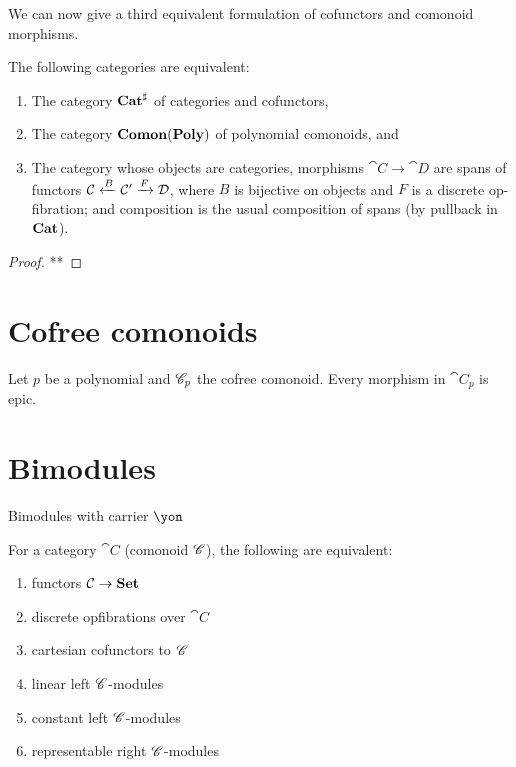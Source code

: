 \documentclass[DynamicalBook]{subfiles}
\begin{document}
We can now give a third equivalent formulation of cofunctors and comonoid morphisms.

\begin{proposition}
The following categories are equivalent:
\begin{enumerate}
	\item The category $\textbf{Cat}^\sharp$ of categories and cofunctors,
	\item The category $\textbf{Comon}(\textbf{Poly})$ of polynomial comonoids, and
	\item The category whose objects are categories, morphisms $\cat{C}\to\cat{D}$ are spans of functors $\mathcal{C}\xleftarrow{B}\mathcal{C}'\xrightarrow{F}\mathcal{D}$, where $B$ is bijective on objects and $F$ is a discrete op-fibration; and composition is the usual composition of spans (by pullback in $\textbf{Cat}$).
\end{enumerate}
\end{proposition}
\begin{proof}
**
\end{proof}


\section{Cofree comonoids}

\begin{proposition}
Let $p$ be a polynomial and $\mathscr{C}_{p}$ the cofree comonoid. Every morphism in $\cat{C}_p$ is epic.
\end{proposition}

\section{Bimodules}

Bimodules with carrier $\yon$

\begin{theorem}
For a category $\cat{C}$ (comonoid $\mathscr{C}$), the following are equivalent:
\begin{enumerate}
	\item functors $\mathcal{C}\to\textbf{Set}$
	\item discrete opfibrations over $\cat{C}$
	\item cartesian cofunctors to $\mathscr{C}$
	\item linear left $\mathscr{C}$-modules
	\item constant left $\mathscr{C}$-modules
	\item representable right $\mathscr{C}$-modules
\end{enumerate}
\end{theorem}
\end{document}
